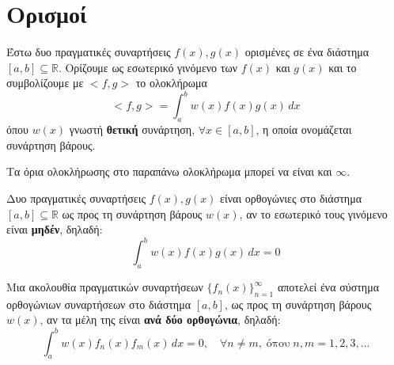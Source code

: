 


\geometry{left=1.5cm,right=1.5cm}
\renewcommand{\qedsymbol}{}

\pagestyle{vangelis}




\begin{center}
  \minibox{\large\bfseries \textcolor{Col1}{Ορθογωνιότητα Συναρτήσεων}}
\end{center}

\vspace{\baselineskip}



\section*{Ορισμοί}

\begin{dfn}
  Έστω δυο πραγματικές συναρτήσεις $ f(x), g(x) $ ορισμένες σε ένα διάστημα 
  $ [a,b] \subseteq \mathbb{R} $. Ορίζουμε ως \textcolor{Col1}{εσωτερικό γινόμενο} 
  των $ f(x) $ και $ g(x) $ και το συμβολίζουμε με $ <f,g> $ το ολοκλήρωμα
  \[
    <f,g> = \int _{a}^{b} w(x) f(x)g(x) \,{dx} 
  \] 
  όπου $ w(x) $ γνωστή \textbf{θετική} συνάρτηση, $ \forall x \in [a,b] $, η οποία 
  ονομάζεται \textcolor{Col1}{συνάρτηση βάρους}.
\end{dfn}

\begin{rem}
  Τα όρια ολοκλήρωσης στο παραπάνω ολοκλήρωμα μπορεί να είναι και $ \infty $.
\end{rem}

\begin{dfn}
  Δυο πραγματικές συναρτήσεις $ f(x), g(x) $ είναι \textcolor{Col1}{ορθογώνιες} 
  στο διάστημα $ [a,b] \subseteq \mathbb{R} $ ως προς τη συνάρτηση βάρους $ w(x) $, 
  αν το εσωτερικό τους γινόμενο είναι \textbf{μηδέν}, δηλαδή:
  \[
    \int _{a}^{b} w(x)f(x)g(x) \,{dx} = 0
  \] 
\end{dfn}

\begin{dfn}
  Μια ακολουθία πραγματικών συναρτήσεων $ \{ f_{n}(x) \}_{n=1}^{\infty} $ αποτελεί 
  ένα \textcolor{Col1}{σύστημα ορθογώνιων συναρτήσεων} στο διάστημα $ [a,b] $, 
  ως προς τη συνάρτηση βάρους $ w(x) $, αν τα μέλη της είναι 
  \textbf{ανά δύο ορθογώνια}, δηλαδή:
  \[
    \int _{a}^{b} w(x) f_{n}(x)f_{m}(x) \,{dx} = 0, \quad \forall n \neq m, \; 
    \text{όπου} \;  n,m = 1,2,3, \ldots
  \] 
\end{dfn}

